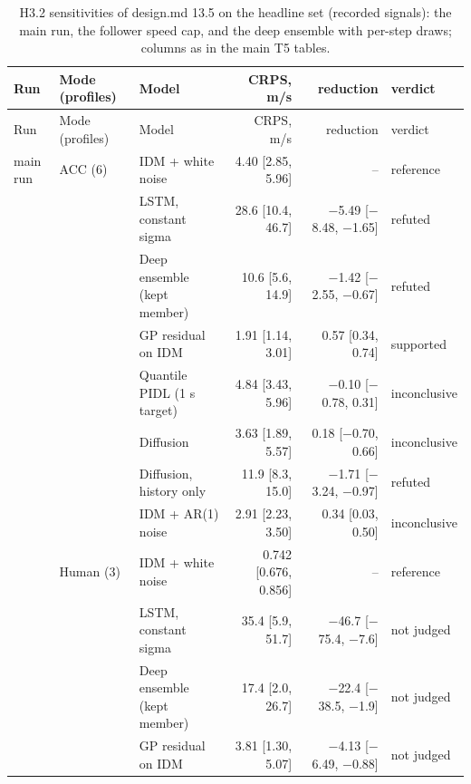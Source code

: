 \begingroup
\small
\begin{longtable}{lllrrl}
\caption{H3.2 sensitivities of design.md 13.5 on the headline set (recorded signals): the main run, the follower speed cap, and the deep ensemble with per-step draws; columns as in the main T5 tables.}\label{tab:t5-h32--sensitivities} \\
\toprule
Run & Mode (profiles) & Model & CRPS, m/s & reduction & verdict \\
\midrule
\endfirsthead
\toprule
Run & Mode (profiles) & Model & CRPS, m/s & reduction & verdict \\
\midrule
\endhead
\bottomrule
\endlastfoot
main run & ACC (6) & IDM + white noise & 4.40 [2.85, 5.96] & -- & reference \\
 &  & LSTM, constant sigma & 28.6 [10.4, 46.7] & $-$5.49 [$-$8.48, $-$1.65] & refuted \\
 &  & Deep ensemble (kept member) & 10.6 [5.6, 14.9] & $-$1.42 [$-$2.55, $-$0.67] & refuted \\
 &  & GP residual on IDM & 1.91 [1.14, 3.01] & 0.57 [0.34, 0.74] & supported \\
 &  & Quantile PIDL (1 s target) & 4.84 [3.43, 5.96] & $-$0.10 [$-$0.78, 0.31] & inconclusive \\
 &  & Diffusion & 3.63 [1.89, 5.57] & 0.18 [$-$0.70, 0.66] & inconclusive \\
 &  & Diffusion, history only & 11.9 [8.3, 15.0] & $-$1.71 [$-$3.24, $-$0.97] & refuted \\
 &  & IDM + AR(1) noise & 2.91 [2.23, 3.50] & 0.34 [0.03, 0.50] & inconclusive \\
\midrule
 & Human (3) & IDM + white noise & 0.742 [0.676, 0.856] & -- & reference \\
 &  & LSTM, constant sigma & 35.4 [5.9, 51.7] & $-$46.7 [$-$75.4, $-$7.6] & not judged \\
 &  & Deep ensemble (kept member) & 17.4 [2.0, 26.7] & $-$22.4 [$-$38.5, $-$1.9] & not judged \\
 &  & GP residual on IDM & 3.81 [1.30, 5.07] & $-$4.13 [$-$6.49, $-$0.88] & not judged \\

\end{longtable}
